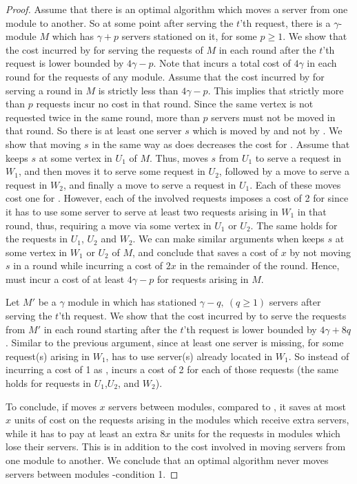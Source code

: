 \begin{proof}
Assume that there is an optimal algorithm \A which moves a server from one module to another. So at some point after serving the $t$'th request, there is a $\gamma$-module $M$ which has $\gamma + p$ servers stationed on it, for some $p \geq 1$. We show that the cost incurred by \A for serving the requests of $M$ in each round after the $t$'th request is lower bounded by $4\gamma - p$. Note that \sol incurs a total cost of $4\gamma$ in each round for the requests of any module. Assume that the cost incurred by  \A for serving a round in $M$ is strictly less than $4\gamma-p$. This implies that strictly more than $p$ requests incur no cost in that round. Since the same vertex is not requested twice in the same round, more than $p$ servers must not be moved in that round. So there is at least one server $s$ which is moved by \sol and not by \A. We show that moving $s$ in the same way as \sol does decreases the cost for \A. Assume that \A keeps $s$ at some vertex in $U_1$ of $M$. Thus, \sol moves $s$ from $U_1$ to serve a request in $W_1$, and then moves it to serve some request in $U_2$, followed by a move to serve a request in $W_2$, and finally a move to serve a request in $U_1$. Each of these moves cost one for \sol. However, each of the involved requests imposes a cost of 2 for \A since it has to use some server to serve at least two requests arising in $W_1$ in that round, thus, requiring a move via some vertex in $U_1$ or $U_2$. The same holds for the requests in $U_1$, $U_2$ and $W_2$. We can make similar arguments when \A keeps $s$ at some vertex in $W_1$ or $U_2$ of $M$, and conclude that \A saves a cost of $x$ by not moving $s$ in a round while incurring a cost of $2x$ in the remainder of the round. Hence, \A must incur a cost of at least $4\gamma-p$ for requests arising in $M$.

Let $M'$ be a $\gamma$ module in which \A has stationed $\gamma - q, ~(q \geq 1)$ servers after serving the $t$'th request. We show that the cost incurred by \A to serve the requests from $M'$ in each round starting after the $t$'th request is lower bounded by $4 \gamma + 8q$. Similar to the previous argument, since at least one server is missing, for some request(s) arising in $W_1$, \A has to use server(s) already located in $W_1$. So instead of incurring a cost of 1 as \sol, \A incurs a cost of 2 for each of those requests (the same holds for requests in $U_1$,$U_2$, and $W_2$).

To conclude, if \A moves $x$ servers between modules, compared to \sol, it saves at most  $x$ units of cost on the requests arising in the modules which receive extra servers, while it has to pay at least an extra $8x$ units for the requests in modules which lose their servers. This is in addition to the cost involved in moving servers from one module to another. We conclude that an optimal algorithm never moves servers between modules -condition 1.  


\end{proof}
